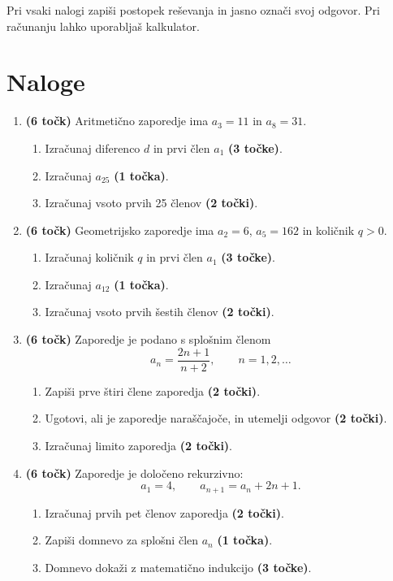 \documentclass[a4paper,12pt]{article}
\begin{document}
Pri vsaki nalogi zapiši postopek reševanja in jasno označi svoj odgovor. Pri računanju lahko uporabljaš kalkulator. 

\newpage

\section*{Naloge}


\begin{enumerate}
	\item \textbf{(6 točk)} Aritmetično zaporedje ima $a_3=11$ in $a_8=31$.
	\begin{enumerate}
		\item Izračunaj diferenco $d$ in prvi člen $a_1$ \textbf{(3 točke)}.
		\item Izračunaj $a_{25}$ \textbf{(1 točka)}.
		\item Izračunaj vsoto prvih 25 členov \textbf{(2 točki)}.
	\end{enumerate}
	\newpage

	\item \textbf{(6 točk)} Geometrijsko zaporedje ima $a_2=6$, $a_5=162$ in količnik $q>0$.
	\begin{enumerate}
		\item Izračunaj količnik $q$ in prvi člen $a_1$ \textbf{(3 točke)}.
		\item Izračunaj $a_{12}$ \textbf{(1 točka)}.
		\item Izračunaj vsoto prvih šestih členov \textbf{(2 točki)}.
	\end{enumerate}
	\newpage

	\item \textbf{(6 točk)} Zaporedje je podano s splošnim členom
	\[
		a_n=\frac{2n+1}{n+2}, \qquad n=1,2,\ldots
	\]
	\begin{enumerate}
		\item Zapiši prve štiri člene zaporedja \textbf{(2 točki)}.
		\item Ugotovi, ali je zaporedje naraščajoče, in utemelji odgovor \textbf{(2 točki)}.
		\item Izračunaj limito zaporedja \textbf{(2 točki)}.
	\end{enumerate}
	\newpage

	\item \textbf{(6 točk)} Zaporedje je določeno rekurzivno:
	\[
		a_1=4, \qquad a_{n+1}=a_n+2n+1.
	\]
	\begin{enumerate}
		\item Izračunaj prvih pet členov zaporedja \textbf{(2 točki)}.
		\item Zapiši domnevo za splošni člen $a_n$ \textbf{(1 točka)}.
		\item Domnevo dokaži z matematično indukcijo \textbf{(3 točke)}.
	\end{enumerate}
	\newpage


\end{enumerate}
\end{document}
